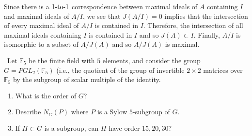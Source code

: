 \documentclass[12pt]{Qual}
\begin{document}
\begin{solution}
Since there is a $1\text{-to-}1$ correspondence between maximal ideals of $A$ containing $I$ and maximal ideals of $A/I$, we see that $J(A/I)=0$ implies that the intersection of every maximal ideal of $A/I$ is contained in $I$. Therefore, the intersection of all maximal ideals containing $I$ is contained in $I$ and so $J(A)\subset I$. Finally, $A/I$ is isomorphic to a subset of  $A/J(A)$ and so $A/J(A)$ is maximal.

\begin{comment}
which are exactly equivalent to $A/M$ for some maximal ideal $M.$

Since $J(A)\subset M$ for all $M$ (because the Jacobson is the intersection of all maximal ideals of $A$), we have that there is a $\oto$ correspondence between maximal ideals of $A$ and maximal ideals of $A/J(A)$.

However, clearly $A/J(A)\cong F^n$ since by the previous part, $J(A)$ contains all strictly upper triangular matrices so $A/J(A)$ is the set of diagonal matrices.

Therefore, the maximal ideals of $A/J(A)$ are exactly isomorphic to $F^{n-1}$.
These correspond to matrices in $A$ where exactly one component down the main diagonal is $0$.

Therefore, if $M_i$ is the maximal ideal corresponding to matrices $X\in A$ where $X_{ii}=0$, then $A/M_i$ is exactly the set of matrices $X$ where the $i\thh$ column is nonzero, and the $j\thh$ column is $0$ for all $j\not=i.$

Note that simple right $A$-modules would correspond exactly to matrices where a single row is nonzero.

Note further that all these simple $A$-modules will be isomorphic trivially since they are all isomorphic to $F$.


Finally, we get that the simple left $A$-modules are exactly $A/M$
\end{comment}

\end{solution}
\newpage



\begin{problem} $\,$
Let $\mathbb{F}_5$ be the finite field with $5$ elements, and consider the group $G=PGL_2(\mathbb{F}_5)$ (i.e., the quotient of the group of invertible $2\times 2$ matrices over $\mathbb{F}_5$ by the subgroup of scalar multiple of the identity.
\begin{enumerate}[label=(\alph*)]
    \item What is the order of $G$?
    \item Describe $N_G(P)$ where $P$ is a Sylow $5$-subgroup of $G$.
    \item If $H\subset G$ is a subgroup, can $H$ have order $15,20, 30?$
\end{enumerate}
\end{problem}
\end{document}
